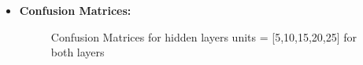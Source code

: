 \documentclass[a4 paper]{article}
\begin{document}
\begin{itemize}
\item \textbf{Confusion Matrices:}
\begin{figure}[H]
    \centering
    \qquad
  	\hspace*{-1.5cm}
    \caption{Confusion Matrices for hidden layers units = [5,10,15,20,25] for both layers}%
    \label{fig:example}%
\end{figure}
\end{itemize}

\end{document}
